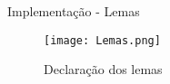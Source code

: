 \begin{frame}{Implementação - Lemas}
    \begin{figure}[htbp]
        \centering
        \texttt{[image: Lemas.png]}
        \caption{Declaração dos lemas}
    \end{figure}
\end{frame}